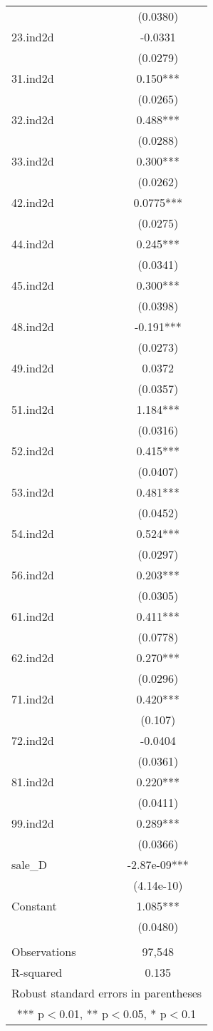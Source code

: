\documentclass[]{article}
\begin{document}
\begin{tabular}{lc}
 & (0.0380) \\
23.ind2d & -0.0331 \\
 & (0.0279) \\
31.ind2d & 0.150*** \\
 & (0.0265) \\
32.ind2d & 0.488*** \\
 & (0.0288) \\
33.ind2d & 0.300*** \\
 & (0.0262) \\
42.ind2d & 0.0775*** \\
 & (0.0275) \\
44.ind2d & 0.245*** \\
 & (0.0341) \\
45.ind2d & 0.300*** \\
 & (0.0398) \\
48.ind2d & -0.191*** \\
 & (0.0273) \\
49.ind2d & 0.0372 \\
 & (0.0357) \\
51.ind2d & 1.184*** \\
 & (0.0316) \\
52.ind2d & 0.415*** \\
 & (0.0407) \\
53.ind2d & 0.481*** \\
 & (0.0452) \\
54.ind2d & 0.524*** \\
 & (0.0297) \\
56.ind2d & 0.203*** \\
 & (0.0305) \\
61.ind2d & 0.411*** \\
 & (0.0778) \\
62.ind2d & 0.270*** \\
 & (0.0296) \\
71.ind2d & 0.420*** \\
 & (0.107) \\
72.ind2d & -0.0404 \\
 & (0.0361) \\
81.ind2d & 0.220*** \\
 & (0.0411) \\
99.ind2d & 0.289*** \\
 & (0.0366) \\
sale\_D & -2.87e-09*** \\
 & (4.14e-10) \\
Constant & 1.085*** \\
 & (0.0480) \\
 &  \\
Observations & 97,548 \\
 R-squared & 0.135 \\ \hline
\multicolumn{2}{c}{ Robust standard errors in parentheses} \\
\multicolumn{2}{c}{ *** p$<$0.01, ** p$<$0.05, * p$<$0.1} \\
\end{tabular}
\end{document}
